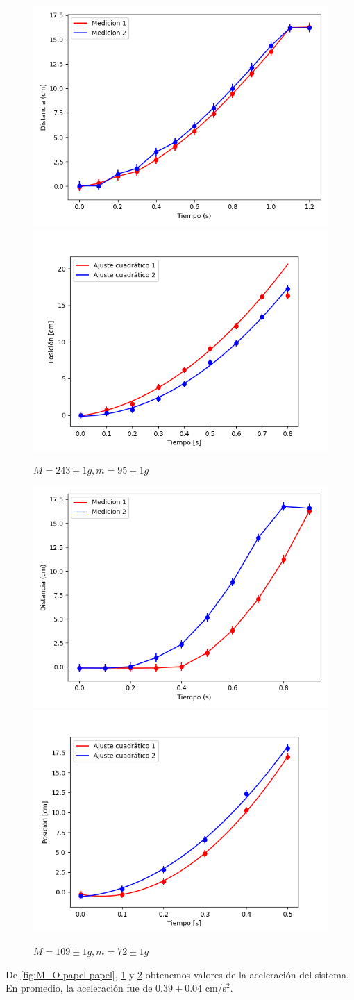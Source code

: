 \documentclass[12pt,a4]{article}
\begin{document}
\begin{figure}[H]
    \centering
    \includegraphics[width=0.4\linewidth]{TiempoVsDistanciaPapelPapelM_OP.png}
    \includegraphics[width=0.44\linewidth]{ajuste2_PapelPapelM_OP.png}
    \caption{$M = 243 \pm 1 g, m = 95 \pm 1 g$}
    \label{fig:M_OP papel papel}
\end{figure}

\begin{figure}[H] %
    \centering
    \includegraphics[width=0.4\linewidth]{TiempoVsDistanciaPapelPapelV_O.png}
    \includegraphics[width=0.44\linewidth]{ajuste2_PapelPapelV_O.png}
    \caption{$M = 109 \pm 1 g, m = 72 \pm 1 g$}
    \label{fig:TvDV_O papel papel}
\end{figure}


De \ref{fig:M_O papel papel}, \ref{fig:M_OP papel papel} y \ref{fig:TvDV_O papel papel} obtenemos valores de la aceleración del sistema. En promedio, la aceleración fue de $0.39 \pm 0.04$ cm/s\(^2\).
\end{document}
